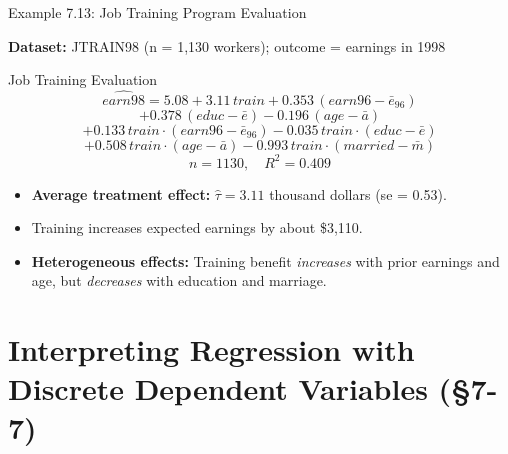 \documentclass[aspectratio=169, 12pt]{beamer}
\begin{document}
\begin{frame}[shrink=30]{Example 7.13: Job Training Program Evaluation}

  \textbf{Dataset:} JTRAIN98 (n = 1,130 workers); outcome = earnings in 1998

  \medskip

  \begin{small}
  \begin{examplebox}{Job Training Evaluation}
    \[
      \widehat{\textit{earn98}} = 5.08 + 3.11 \, \textit{train} + 0.353 \, (\textit{earn96} - \bar{e}_{96})
    \]
    \[
      + 0.378 \, (\textit{educ} - \bar{e}) - 0.196 \, (\textit{age} - \bar{a})
    \]
    \[
      + 0.133 \, \textit{train} \cdot (\textit{earn96} - \bar{e}_{96}) - 0.035 \, \textit{train} \cdot (\textit{educ} - \bar{e})
    \]
    \[
      + 0.508 \, \textit{train} \cdot (\textit{age} - \bar{a}) - 0.993 \, \textit{train} \cdot (\textit{married} - \bar{m})
    \]
    \[
      n = 1130, \quad R^2 = 0.409
    \]
  \end{examplebox}
  \end{small}

  \medskip

  \begin{keybox}
    \begin{itemize}
      \item \textbf{Average treatment effect:} $\hat{\tau} = 3.11$ thousand dollars (se = 0.53).
      \item Training increases expected earnings by about \$3,110.
      \item \textbf{Heterogeneous effects:} Training benefit \textit{increases} with prior earnings and age, but \textit{decreases} with education and marriage.
    \end{itemize}
  \end{keybox}

\end{frame}

\section{Interpreting Regression with Discrete Dependent Variables (\S7-7)}
\end{document}
